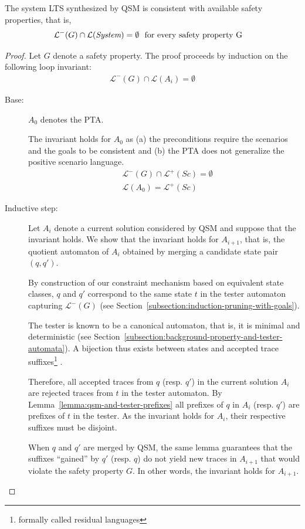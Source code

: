 \begin{theorem}
\label{theorem:system-lts-consistency-with-goals}
The system LTS synthesized by QSM is consistent with available safety properties, that is,
\begin{align*}
&\mathcal{L}^-(G) \cap \mathcal{L}(\emph{System}) = \emptyset \mbox{~~for every safety property~G}
\end{align*}

\begin{proof}
Let $G$ denote a safety property. The proof proceeds by induction on the following loop invariant:
\begin{align*}
\mathcal{L}^-(G) \cap \mathcal{L}(A_i) = \emptyset
\end{align*}

\begin{description}
\item[Base:] $A_0$ denotes the PTA.

The invariant holds for $A_0$ as (a) the preconditions require the scenarios and the goals to be consistent and (b) the PTA does not generalize the positive scenario language.
\begin{align*}
&\mathcal{L}^-(G) \cap \mathcal{L}^+(Sc) = \emptyset\\
&\mathcal{L}(A_0) = \mathcal{L}^+(Sc)
\end{align*}

\item[Inductive step:] Let $A_i$ denote a current solution considered by QSM and suppose that the invariant holds. We show that the invariant holds for $A_{i+1}$, that is, the quotient automaton of $A_i$ obtained by merging a candidate state pair $(q,q')$.

By construction of our constraint mechanism based on equivalent state classes, $q$ and $q'$ correspond to the same state $t$ in the tester automaton capturing $\mathcal{L}^-(G)$ (see Section~\ref{subsection:induction-pruning-with-goals}).

The tester is known to be a canonical automaton, that is, it is minimal and deterministic (see Section~\ref{subsection:background-property-and-tester-automata}). A bijection thus exists between states and accepted trace suffixes\footnote{formally called residual languages} \cite{Hopcroft:1979}. 

Therefore, all accepted traces from $q$ (resp. $q'$) in the current solution $A_i$ are rejected traces from $t$ in the tester automaton. By Lemma~\ref{lemma:qsm-and-tester-prefixes} all prefixes of $q$ in $A_i$ (resp. $q'$) are prefixes of $t$ in the tester. As the invariant holds for $A_i$, their respective suffixes must be disjoint.

When $q$ and $q'$ are merged by QSM, the same lemma guarantees that the suffixes ``gained'' by $q'$ (resp. $q$) do not yield new traces in $A_{i+1}$ that would violate the safety property $G$. In other words, the invariant holds for $A_{i+1}$.
\end{description}
\end{proof}
\end{theorem}

